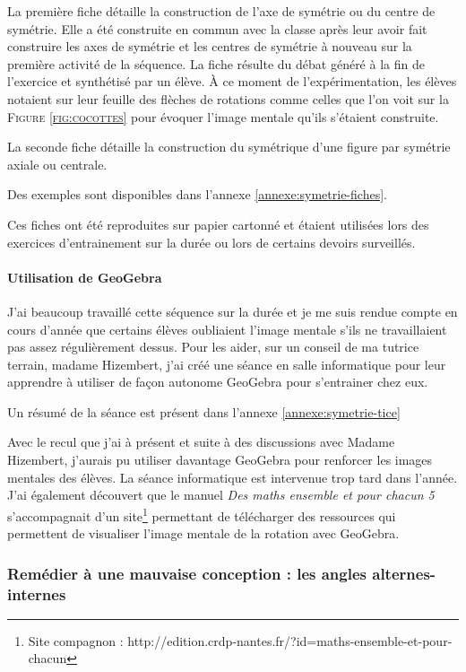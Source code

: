 La première fiche détaille la construction de l'axe de symétrie ou du centre de symétrie. Elle a été construite en commun avec la classe après leur avoir fait construire les axes de symétrie et les centres de symétrie à nouveau sur la première activité de la séquence. La fiche résulte du débat généré à la fin de l'exercice et synthétisé par un élève. À ce moment de l'expérimentation, les élèves notaient sur leur feuille des flèches de rotations comme celles que l'on voit sur la \textsc{Figure \ref{fig:cocottes}} pour évoquer l'image mentale qu'ils s'étaient construite.

La seconde fiche détaille la construction du symétrique d'une figure par symétrie axiale ou centrale.

Des exemples sont disponibles dans l'annexe \ref{annexe:symetrie-fiches}.

Ces fiches ont été reproduites sur papier cartonné et étaient utilisées lors des exercices d'entrainement sur la durée ou lors de certains devoirs surveillés.

\paragraph{Utilisation de GeoGebra}

J'ai beaucoup travaillé cette séquence sur la durée et je me suis rendue compte en cours d'année que certains élèves oubliaient l'image mentale s'ils ne travaillaient pas assez régulièrement dessus. Pour les aider, sur un conseil de ma tutrice terrain, madame Hizembert, j'ai créé une séance en salle informatique pour leur apprendre à utiliser de façon autonome GeoGebra pour s'entrainer chez eux.

Un résumé de la séance est présent dans l'annexe \ref{annexe:symetrie-tice}

Avec le recul que j'ai à présent et suite à des discussions avec Madame Hizembert, j'aurais pu utiliser davantage GeoGebra pour renforcer les images mentales des élèves. La séance informatique est intervenue trop tard dans l'année. J'ai également découvert que le manuel \textit{Des maths ensemble et pour chacun 5} s'accompagnait d'un site\footnote{Site compagnon : http://edition.crdp-nantes.fr/?id=maths-ensemble-et-pour-chacun} permettant de télécharger des ressources qui permettent de visualiser l'image mentale de la rotation avec GeoGebra.

\subsubsection{Remédier à une mauvaise conception : les angles alternes-internes}

